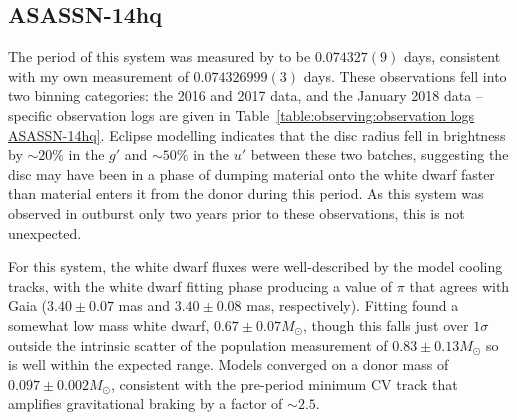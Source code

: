 \newpage
\subsection{ASASSN-14hq}

The period of this system was measured by \citep{paterson2019} to be $0.074327(9)$ days, consistent with my own measurement of $0.074326999(3)$ days.
These observations fell into two binning categories: the 2016 and 2017 data, and the January 2018 data -- specific observation logs are given in Table~\ref{table:observing:observation logs ASASSN-14hq}.
Eclipse modelling indicates that the disc radius fell in brightness by $\sim 20\%$ in the $g'$ and $\sim 50\%$ in the $u'$ between these two batches, suggesting the disc may have been in a phase of dumping material onto the white dwarf faster than material enters it from the donor during this period. As this system was observed in outburst only two years prior to these observations, this is not unexpected.

For this system, the white dwarf fluxes were well-described by the model cooling tracks, with the white dwarf fitting phase producing a value of $\pi$ that agrees with Gaia ($3.40\pm0.07$ mas and $3.40\pm0.08$ mas, respectively).
Fitting found a somewhat low mass white dwarf, $0.67 \pm 0.07 M_\odot$, though this falls just over $1\sigma$ outside the intrinsic scatter of the \citet{pala2020} population measurement of $0.83\pm0.13 M_\odot$ so is well within the expected range. Models converged on a donor mass of $0.097\pm0.002 M_\odot$, consistent with the pre-period minimum CV track that amplifies gravitational braking by a factor of $\sim 2.5$.


%     

